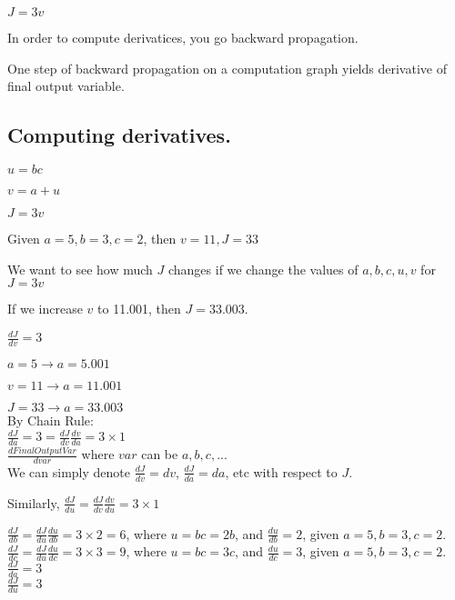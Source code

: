 \documentclass{article}
\begin{document}
    $J=3v$

    In order to compute derivatices, you go backward propagation.

    One step of backward propagation on a computation graph yields derivative of final output variable.



\newpage
\subsection{Computing derivatives.}

    $u=bc$

    $v = a+u$

    $J=3v$

    Given $a=5, b=3, c=2$, then $v=11, J=33$

    We want to see how much $J$ changes if we change the values of $a,b,c,u,v$ for $J=3v$

    If we increase $v$ to 11.001, then $J=33.003$.

    $\frac{dJ}{dv} = 3$

    $a=5 \rightarrow a=5.001$

$v=11 \rightarrow a=11.001$

$J=33 \rightarrow a=33.003$\\

By Chain Rule:\\

$\frac{dJ}{da} = 3 = \frac{dJ}{dv}\frac{dv}{da} = 3 \times 1$\\

$\frac{dFinalOutputVar}{dvar}$ where $var$ can be $a,b,c,...$\\

We can simply denote $\frac{dJ}{dv} = dv$,
$\frac{dJ}{da} = da$, etc with respect to $J$.

Similarly, $\frac{dJ}{du} = \frac{dJ}{dv}\frac{dv}{du} = 3\times 1$

$\frac{dJ}{db} = \frac{dJ}{du}\frac{du}{db} = 3 \times 2 = 6$, where $u=bc = 2b$, and $\frac{du}{db} = 2$, given $a=5, b=3, c=2$.\\

$\frac{dJ}{dc} = \frac{dJ}{du}\frac{du}{dc} = 3 \times 3 = 9$, where $u=bc = 3c$, and $\frac{du}{dc} = 3$, given $a=5, b=3, c=2$.\\

$\displaystyle \frac{dJ}{da} = 3$\\

$\displaystyle \frac{dJ}{du} = 3$\\
\end{document}
